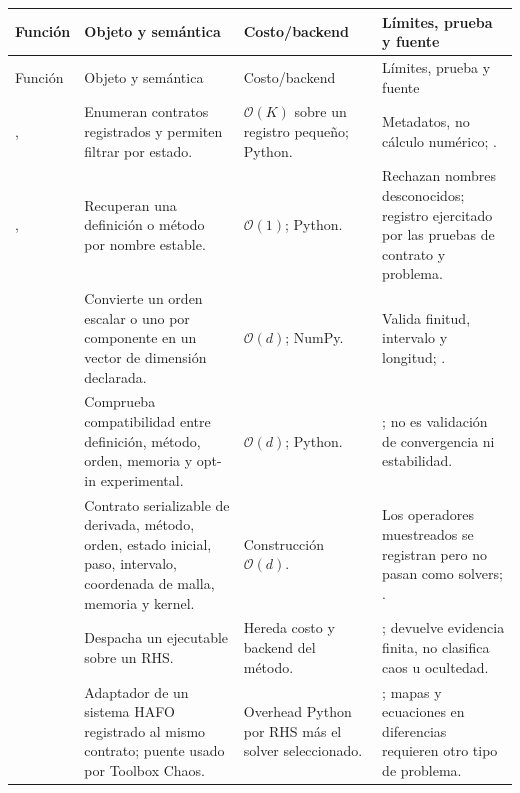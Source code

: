 \begin{center}
\scriptsize
\begin{longtable}{@{}L{0.23\textwidth}L{0.23\textwidth}L{0.23\textwidth}L{0.23\textwidth}@{}}
\toprule
Función & Objeto y semántica & Costo/backend & Límites, prueba y fuente \\
\midrule
\endfirsthead
\toprule
Función & Objeto y semántica & Costo/backend & Límites, prueba y fuente \\
\midrule
\endhead
{},
 & Enumeran contratos registrados y permiten filtrar por estado. & \(\mathcal O(K)\) sobre un registro pequeño; Python. & Metadatos, no cálculo numérico; . \\
\addlinespace
{},
 & Recuperan una definición o método por nombre estable. & \(\mathcal O(1)\); Python. & Rechazan nombres desconocidos; registro ejercitado por las pruebas de contrato y problema. \\
\addlinespace
{} & Convierte un orden escalar o uno por componente en un vector de dimensión declarada. & \(\mathcal O(d)\); NumPy. & Valida finitud, intervalo y longitud; . \\
\addlinespace
{} & Comprueba compatibilidad entre definición, método, orden, memoria y opt-in experimental. & \(\mathcal O(d)\); Python. & ; no es validación de convergencia ni estabilidad. \\
\addlinespace
{} & Contrato serializable de derivada, método, orden, estado inicial, paso, intervalo, coordenada de malla, memoria y kernel. & Construcción \(\mathcal O(d)\). & Los operadores muestreados se registran pero no pasan como solvers; . \\
\addlinespace
{} & Despacha un  ejecutable sobre un RHS. & Hereda costo y backend del método. & ; devuelve evidencia finita, no clasifica caos u ocultedad. \\
\addlinespace
{} & Adaptador de un sistema HAFO registrado al mismo contrato; puente usado por Toolbox Chaos. & Overhead Python por RHS más el solver seleccionado. & ; mapas y ecuaciones en diferencias requieren otro tipo de problema. \\

\end{longtable}
\end{center}

